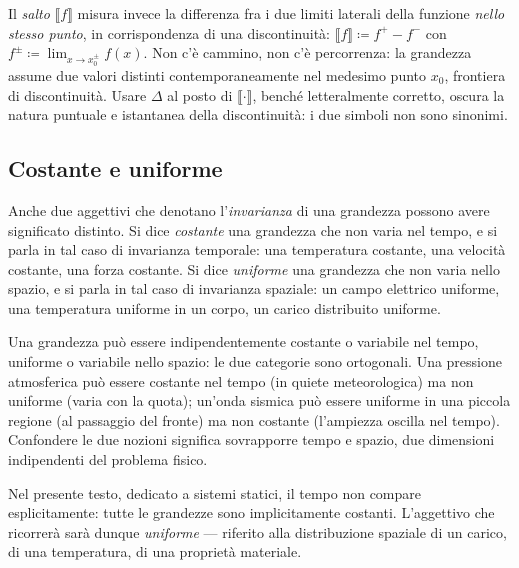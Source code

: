 Il \textit{salto} $\llbracket f \rrbracket$ misura invece la 
differenza fra i due limiti laterali della funzione 
\emph{nello stesso punto}, in corrispondenza di una 
discontinuità: $\llbracket f \rrbracket \coloneqq f^+ - f^-$ con 
$f^\pm \coloneqq \lim_{x\to x_0^\pm} f(x)$. Non c'è cammino, non c'è 
percorrenza: la grandezza assume due valori distinti 
contemporaneamente nel medesimo punto $x_0$, frontiera di 
discontinuità. 	Usare $\Delta$ al posto di $\llbracket\cdot\rrbracket$, 
benché letteralmente corretto, oscura la natura puntuale e 
istantanea della discontinuità: i due simboli non sono 
sinonimi.

\subsection{Costante e uniforme}\label{sec:costante_uniforme}

Anche due aggettivi che denotano l'\emph{invarianza} di una
grandezza possono avere significato distinto. Si dice 
\textit{costante} una grandezza che non varia nel tempo, e si
parla in tal caso di invarianza temporale: una temperatura
costante, una velocità costante, una forza costante. Si dice
\textit{uniforme} una grandezza che non varia nello spazio, e
si parla in tal caso di invarianza spaziale: un campo elettrico
uniforme, una temperatura uniforme in un corpo, un carico
distribuito uniforme.

Una grandezza può essere indipendentemente costante o variabile
nel tempo, uniforme o variabile nello spazio: le due categorie
sono ortogonali. Una pressione atmosferica può essere costante
nel tempo (in quiete meteorologica) ma non uniforme (varia con
la quota); un'onda sismica può essere uniforme in una piccola
regione (al passaggio del fronte) ma non costante (l'ampiezza
oscilla nel tempo). Confondere le due nozioni significa
sovrapporre tempo e spazio, due dimensioni indipendenti del
problema fisico.

Nel presente testo, dedicato a sistemi statici, il tempo non
compare esplicitamente: tutte le grandezze sono implicitamente
costanti. L'aggettivo che ricorrerà sarà dunque
\emph{uniforme} --- riferito alla distribuzione spaziale di un
carico, di una temperatura, di una proprietà materiale.


